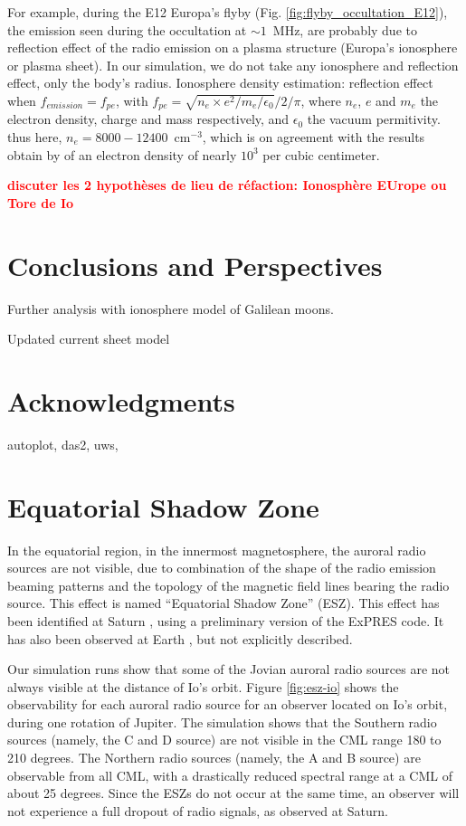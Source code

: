 \documentclass[referee]{aa}
\newcommand{\tbd}[1]{\textcolor{red}{\textbf{#1}}}
\begin{document}
 For example, during the E12 Europa's flyby (Fig. \ref{fig:flyby_occultation_E12}), the emission seen during the occultation at $\sim 1$~MHz, are probably due to reflection effect of the radio emission on a plasma structure (Europa's ionosphere or plasma sheet). In our simulation, we do not take any ionosphere and reflection effect, only the body's radius. Ionosphere density estimation: reflection effect when $f_{emission}=f_{pe}$, with $f_{pe}=\sqrt{n_e \times e^2 /m_e / \epsilon_0}/2/\pi$, where $n_e$, $e$ and $m_e$ the electron density, charge and mass respectively, and $\epsilon_0$ the vacuum permitivity. thus here, $n_e=8000-12400$~cm$^{-3}$, which is on agreement with the results obtain by \citep{Kliore_1997_Science} of an electron density of nearly $10^3$ per cubic centimeter.

\tbd{discuter les 2 hypothèses de lieu de réfaction: Ionosphère EUrope ou Tore de Io}

\section{Conclusions and Perspectives} 

Further analysis with ionosphere model of Galilean moons.

Updated current sheet model

\section*{Acknowledgments}

autoplot, das2, uws, 

\appendix
\section{Equatorial Shadow Zone}
\label{appendix:esz}
In the equatorial region, in the innermost magnetosphere, the auroral radio sources are not visible, due to combination of the shape of the radio emission beaming patterns and the topology of the magnetic field lines bearing the radio source. This effect is named ``Equatorial Shadow Zone'' (ESZ). This effect has been identified at Saturn \citep{lamy_JGR_08b}, using a preliminary version of the ExPRES code. It has also been observed at Earth \citep[see, e.g.,][Figure 1]{morioka:insu-01180185}, but not explicitly described.

Our simulation runs show that some of the Jovian auroral radio sources are not always visible at the distance of Io's orbit. Figure \ref{fig:esz-io} shows the observability for each auroral radio source for an observer located on Io's orbit, during one rotation of Jupiter. The simulation shows that the Southern radio sources (namely, the C and D source) are not visible in the CML range 180 to 210 degrees. The Northern radio sources (namely, the A and B source) are observable from all CML, with a drastically reduced spectral range at a CML of about 25 degrees. Since the ESZs do not occur at the same time, an observer will not experience a full dropout of radio signals, as observed at Saturn. 
\end{document}
